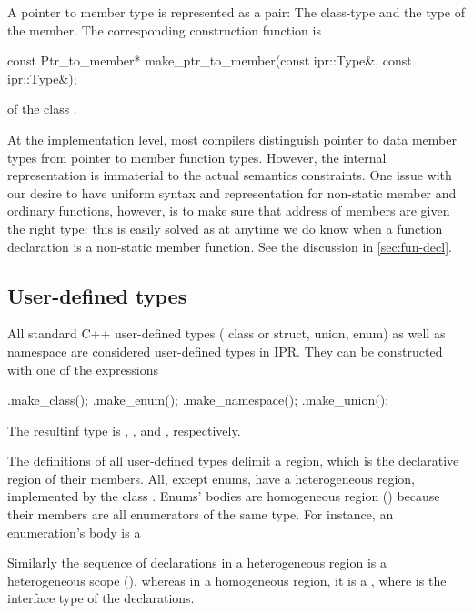 \documentclass[a4paper,12pt]{article}
\begin{document}
A pointer to member type is represented as a pair: The class-type and the type
of the member.  The corresponding construction function is
\begin{Program}
  const Ptr_to_member* make_ptr_to_member(const ipr::Type&,
                                          const ipr::Type&);
\end{Program}
of the class .

At the implementation level, most compilers distinguish pointer to data
member types from pointer to member function types. However, the internal
representation is immaterial to the actual semantics constraints. One issue
with our desire to have uniform syntax and representation for non-static
member and ordinary functions, however, is to make sure that address of
members are given the right type:  this is easily solved as at anytime we do
know when a function declaration is a non-static member function.  See the
discussion in \ref{sec:fun-decl}.


\subsection{User-defined types}
\label{sec:type.udt}

All standard C++ user-defined types (\eg{} class or struct, union, enum)
as well as namespace are considered user-defined types in IPR.  They can be
constructed with one of the expressions
\begin{Program}
  .make_class();
  .make_enum();
  .make_namespace();
  .make_union();
\end{Program}
The resultinf type is , , 
 and , respectively.

The definitions of all user-defined types delimit a region, which is the
declarative region of their members.  All, except enums, have a heterogeneous 
region, implemented by the class .
Enums' bodies are homogeneous region ()
because their members are all enumerators of the same type.  For instance, an
enumeration's body is a 


Similarly  the sequence of declarations in a heterogeneous region is a 
heterogeneous scope (), whereas in a homogeneous region,
it is a , where  is the interface 
type of the declarations.  
\end{document}
